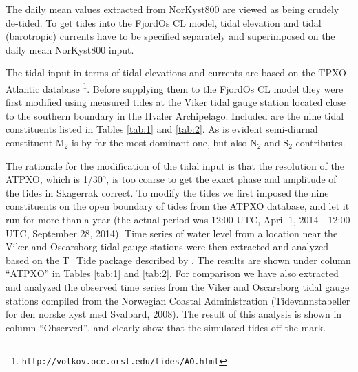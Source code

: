 The daily mean values extracted from NorKyst800 are viewed as being crudely de-tided. To get tides into the FjordOs CL model, tidal elevation and tidal (barotropic) currents have to be specified separately and superimposed on the daily mean NorKyst800 input. 

The tidal input in terms of tidal elevations and currents are based on the TPXO Atlantic database \citep[][hereafter ATPXO]{egber:erofe:2002}\footnote{\texttt{http://volkov.oce.orst.edu/tides/AO.html}}. Before supplying them to the FjordOs CL model they were first modified using measured tides at the Viker tidal gauge station located close to the southern boundary in the Hvaler Archipelago. Included are the nine tidal constituents listed in Tables \ref{tab:1} and \ref{tab:2}. As is evident semi-diurnal constituent M$_2$ is by far the most dominant one, but also N$_2$ and S$_2$ contributes. 


The rationale for the modification of the tidal input is that the resolution of the ATPXO, which is 1/30$^{\textrm{o}}$, is too coarse to get the exact phase and amplitude of the tides in Skagerrak correct. To modify the tides we first imposed the nine constituents on the open boundary of tides from the ATPXO database, and let it run for more than a year (the actual period was 12:00 UTC, April 1, 2014 - 12:00 UTC, September 28, 2014). Time series of water level from a location near the Viker and Oscarsborg tidal gauge stations were then extracted and analyzed based on the T\_Tide package described by \cite{pavlo:etal:2002}. The results are shown under column ``ATPXO'' in Tables \ref{tab:1} and \ref{tab:2}. For comparison we have also extracted and analyzed the observed time series from the Viker and Oscarsborg tidal gauge stations compiled from the Norwegian Coastal Administration (Tidevannstabeller for den norske kyst med Svalbard, 2008). The result of this analysis is shown in column ``Observed'', and clearly show that the simulated tides off the mark.  



